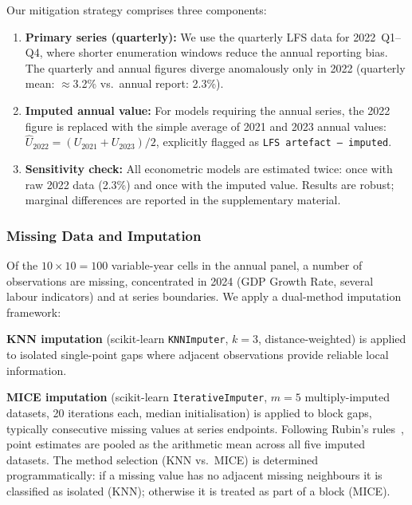 \documentclass[sigconf]{acmart}
\begin{document}
Our mitigation strategy comprises three components:

\begin{enumerate}[leftmargin=*, nosep]
  \item \textbf{Primary series (quarterly):} We use the quarterly
    LFS data for 2022~Q1--Q4, where shorter enumeration windows
    reduce the annual reporting bias. The quarterly and annual
    figures diverge anomalously only in 2022 (quarterly mean:
    $\approx$3.2\% vs.\ annual report: 2.3\%).
  \item \textbf{Imputed annual value:} For models requiring the
    annual series, the 2022 figure is replaced with the simple
    average of 2021 and 2023 annual values:
    $\hat{U}_{2022} = (U_{2021} + U_{2023}) / 2$, explicitly
    flagged as \texttt{LFS artefact --- imputed}.
  \item \textbf{Sensitivity check:} All econometric models are
    estimated twice: once with raw 2022 data (2.3\%) and once with
    the imputed value. Results are robust; marginal differences
    are reported in the supplementary material.
\end{enumerate}

\subsubsection{Missing Data and Imputation}

Of the $10 \times 10 = 100$ variable-year cells in the annual panel,
a number of observations are missing, concentrated in 2024 (GDP Growth
Rate, several labour indicators) and at series boundaries.
We apply a dual-method imputation framework:

\textbf{KNN imputation} (scikit-learn \texttt{KNNImputer},
$k{=}3$, distance-weighted) is applied to isolated single-point gaps
where adjacent observations provide reliable local information.

\textbf{MICE imputation} (scikit-learn \texttt{IterativeImputer},
$m{=}5$ multiply-imputed datasets, 20 iterations each, median
initialisation) is applied to block gaps, typically consecutive
missing values at series endpoints. Following Rubin's
rules~\cite{vanbuuren2018}, point estimates are pooled as the
arithmetic mean across all five imputed datasets. The method
selection (KNN vs.\ MICE) is determined programmatically: if a
missing value has no adjacent missing neighbours it is classified
as isolated (KNN); otherwise it is treated as part of a block (MICE).
\end{document}
